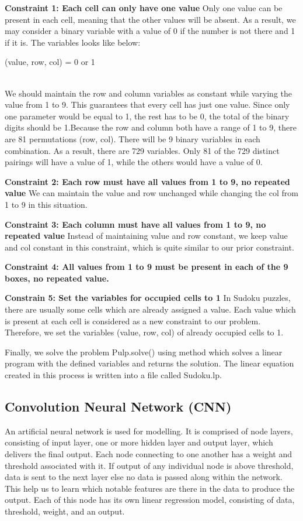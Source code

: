 \textbf{Constraint 1: Each cell can only have one value} 
Only one value can be present in each cell, meaning that the other values will be absent. As a result, we may consider a binary variable with a value of 0 if the number is not there and 1 if it is. The variables looks like below:\\
\centerline{(value, row, col) = 0 or 1}\\
We should maintain the row and column variables as constant while varying the value from 1 to 9. This guarantees that every cell has just one value. Since only one parameter would be equal to 1, the rest has to be 0, the total of the binary digits should be 1.Because the row and column both have a range of 1 to 9, there are 81 permutations (row, col). There will be 9 binary variables in each combination. As a result, there are 729 variables. Only 81 of the 729 distinct pairings will have a value of 1, while the others would have a value of 0. 

\textbf{Constraint 2: Each row must have all values from 1 to 9, no repeated value}
We can maintain the value and row unchanged while changing the col from 1 to 9 in this situation.

\textbf{Constraint 3: Each column must have all values from 1 to 9, no repeated value}
Instead of maintaining value and row constant, we keep value and col constant in this constraint, which is quite similar to our prior constraint.

\textbf{Constraint 4: All values from 1 to 9 must be present in each of the 9 boxes, no repeated value.}

\textbf{Constrain 5: Set the variables for occupied cells to 1}
In Sudoku puzzles, there are usually some cells which are already assigned a value. Each value which is present at each cell is considered as a new constraint to our problem. Therefore, we set the variables (value, row, col) of already occupied cells to 1.

Finally, we solve the problem Pulp.solve() using method which solves a linear program with the defined variables and returns the solution. The linear equation created in this process is written into a file called Sudoku.lp.

\subsection{Convolution Neural Network (CNN)}

An artificial neural network is used for modelling. It is comprised of node layers, consisting of input layer, one or more hidden layer and output layer, which delivers the final output. Each node connecting to one another has a weight and threshold associated with it. If output of any individual node is above threshold, data is sent to the next layer else no data is passed along within the network. This help us to learn which notable features are there in the data to produce the output. Each of this node has its own linear regression model, consisting of data, threshold, weight, and an output.  

